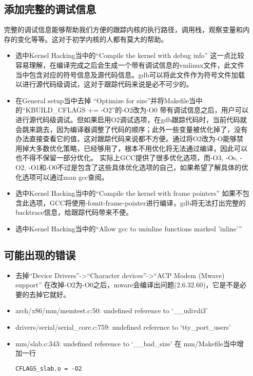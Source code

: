 \documentclass[b5paper,9pt,twoside,openany]{article}
\begin{document}
\subsection{添加完整的调试信息}
完整的调试信息能够帮助我们方便的跟踪内核的执行路径，调用栈，观察变量和内存的变化等等。这对于初学内核的人都有莫大的帮助。
\begin{itemize}
\item 选中Kernel Hacking当中的“Compile the kernel with debug info”
这一点比较容易理解，在编译完成之后会生成一个带有调试信息的vmlinux文件，此文件当中包含对应的符号信息及源代码信息。gdb可以将此文件作为符号文件加载以进行源代码级调试，这对于跟踪代码来说是必不可少的。
\item 在General setup当中去掉 “Optimize for size”并将Makefile当中的“KBUILD\_CFLAGS   += -O2”的-O2改为-O0
带有调试信息之后，用户可以进行源代码级调试。但如果启用O2调试选项，在gdb跟踪代码时，当前代码就会跳来跳去，因为编译器调整了代码的顺序；此外一些变量被优化掉了，没有办法直接查看它的值，这对跟踪代码来说都不方便。通过将O2改为-O能够禁用掉大多数优化策略，已经够用了，根本不用优化将无法通过编译，因此可以也不得不保留一部分优化。
实际上GCC提供了很多优化选项，而-O3, -Os, -O2, -O1和-O0不过是包含了这些具体优化选项的自己，如果希望了解具体的优化选项可以通过man gcc查阅。
\item 选中Kernel Hacking当中的“Compile the kernel with frame pointers”
如果不包含此选项，GCC将使用-fomit-frame-pointer进行编译，gdb将无法打出完整的backtrace信息，给跟踪代码带来不便。

\item 选中Kernel Hacking当中的“Allow gcc to uninline functions marked 'inline'”
\end{itemize}

\subsection{可能出现的错误}
\begin{itemize}
\item 去掉“Device Drivers”->“Character devices”->“ACP Modem (Mwave) support”
在改掉-O2为-O0之后，mware会编译出问题(2.6.32.60)，它是不是必要的去掉它就好。
\item arch/x86/mm/memtest.c:50: undefined reference to `\_\_udivdi3'
\item drivers/serial/serial\_core.c:759: undefined reference to `tty\_port\_users'
\item mm/slab.c:343: undefined reference to `\_\_bad\_size'
在 mm/Makefile当中增加一行
\begin{lstlisting}
CFLAGS_slab.o = -O2
\end{lstlisting}
\end{itemize}
\end{document}
